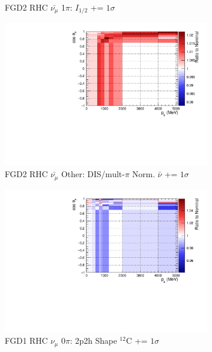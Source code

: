 \begin{figure}[!htbp]
\begin{subfigure}{.32\textwidth}
  \caption{FGD2 RHC $\bar{\nu_{\mu}}$ 1$\pi$: $I_{1/2}$ += $1\sigma$}
  \label{fig:sigvar_FGD2_anti-numuCC_1pi}
\end{subfigure}
\begin{subfigure}{.32\textwidth}
  \centering
  \includegraphics[width=0.85\linewidth]{figs/sig/FGD2_anti-numuCC_other_CC_DIS_MultPi_Norm_Nubar_+1sig.pdf}
  \caption{FGD2 RHC $\bar{\nu_{\mu}}$ Other: DIS/mult-$\pi$ Norm. $\bar{\nu}$ += $1\sigma$}
  \label{fig:sigvar_FGD2_anti-numuCC_other}
\end{subfigure}
\begin{subfigure}{.32\textwidth}
  \centering
  \includegraphics[width=0.85\linewidth]{figs/sig/FGD1_NuMuBkg_CC0pi_in_AntiNu_Mode_2p2h_shape_C_+1sig.pdf}
  \caption{FGD1 RHC $\nu_{\mu}$ 0$\pi$: 2p2h Shape $^{12}$C += $1\sigma$}
  \label{fig:sigvar_FGD1_NuMuBkg_CC0pi_in_AntiNu_Mode}
\end{subfigure}
\begin{subfigure}{.32\textwidth}
  \centering

\end{subfigure}
\end{figure}
